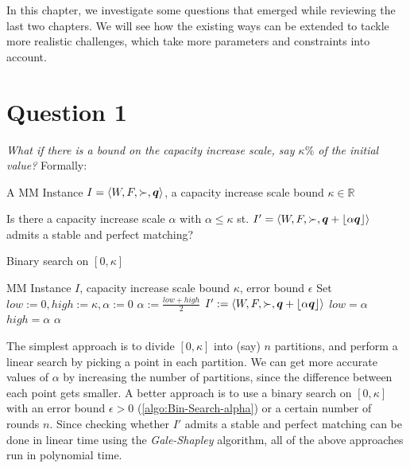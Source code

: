 In this chapter, we investigate some questions that emerged while reviewing the last two chapters. We will see how the existing ways can be extended to tackle more realistic challenges, which take more parameters and constraints into account.

\section{Question 1}

\textit{What if there is a bound on the capacity increase scale, say $\kappa\%$ of the initial value?} Formally:

\begin{pinput}
  A MM Instance $I = \left< W, F, \succ, \boldsymbol{q} \right>$, a capacity increase scale bound $\kappa \in \mathbb{R}$
\end{pinput}
\begin{question}
  Is there a capacity increase scale $\alpha$ with $\alpha \leq \kappa$ st. $I' = \left< W, F, \succ, \boldsymbol{q} + \lfloor \alpha \boldsymbol{q} \rfloor \right>$ admits a stable and perfect matching?
\end{question}

\begin{algorithm}
  \caption{Binary search on $[0, \kappa]$}
  \label{algo:Bin-Search-alpha}
  \begin{algorithmic}
    \REQUIRE MM Instance $I$, capacity increase scale bound $\kappa$, error bound $\epsilon$
    \STATE Set $low := 0, high := \kappa, \alpha := 0$
    \STATE $\alpha := \frac{low + high}{2}$
    \STATE $I' := \left< W, F, \succ, \boldsymbol{q} + \lfloor \alpha \boldsymbol{q} \rfloor \right>$
    \STATE $low = \alpha$
    \ELSE
    \STATE $high = \alpha$
    \ENDIF
    \ENDWHILE
    \RETURN $\alpha$
  \end{algorithmic}
\end{algorithm}

The simplest approach is to divide $[0, \kappa]$ into (say) $n$ partitions, and perform a linear search by picking a point in each partition. We can get more accurate values of $\alpha$ by increasing the number of partitions, since the difference between each point gets smaller. A better approach is to use a binary search on $[0, \kappa]$ with an error bound $\epsilon > 0$ (\autoref{algo:Bin-Search-alpha}) or a certain number of rounds $n$. Since checking whether $I'$ admits a stable and perfect matching can be done in linear time using the \textit{Gale-Shapley} algorithm, all of the above approaches run in polynomial time.

